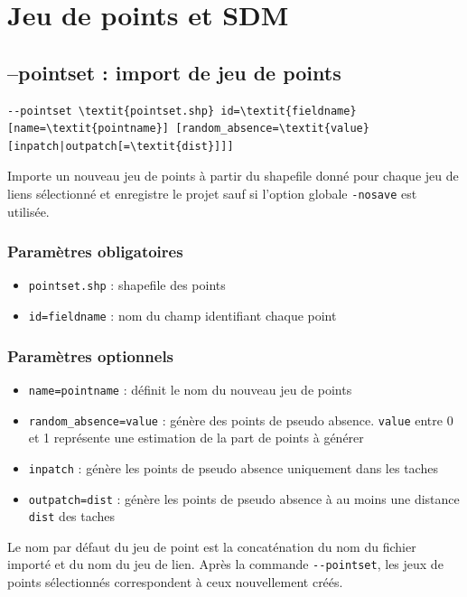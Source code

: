 \documentclass[a4paper,10pt]{report}
\begin{document}
\section{Jeu de points et SDM}
\subsection{--pointset : import de jeu de points}
\begin{Verbatim}[commandchars=\\\{\}]
--pointset \textit{pointset.shp} id=\textit{fieldname} [name=\textit{pointname}] [random_absence=\textit{value} [inpatch|outpatch[=\textit{dist}]]]
\end{Verbatim}
Importe un nouveau jeu de points à partir du shapefile donné pour chaque jeu de liens sélectionné et enregistre le projet sauf si l'option globale \verb|-nosave| est utilisée.

\subsubsection{Paramètres obligatoires}
\begin{itemize}
	\item \verb|pointset.shp| : shapefile des points
	\item \verb|id=fieldname| : nom du champ identifiant chaque point
\end{itemize}

\subsubsection{Paramètres optionnels}
\begin{itemize}
	\item \verb|name=pointname| : définit le nom du nouveau jeu de points
	\item \verb|random_absence=value| : génère des points de pseudo absence. \verb|value| entre 0 et 1 représente une estimation de la part de points à générer
	\item \verb|inpatch| : génère les points de pseudo absence uniquement dans les taches
	\item \verb|outpatch=dist| : génère les points de pseudo absence à au moins une distance \verb|dist| des taches	
\end{itemize}

Le nom par défaut du jeu de point est la concaténation du nom du fichier importé et du nom du jeu de lien.
Après la commande \verb|--pointset|, les jeux de points sélectionnés correspondent à ceux nouvellement créés.
\end{document}
